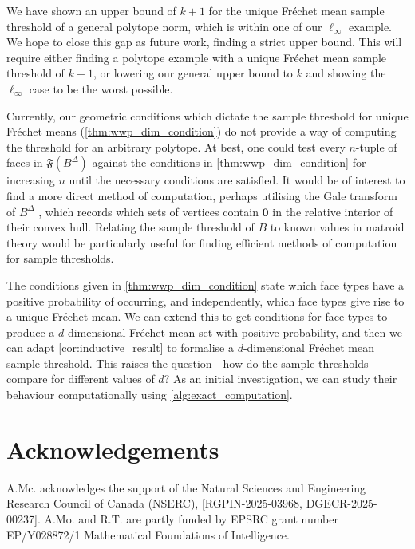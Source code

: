 \documentclass[10pt]{article}
\theoremstyle{definition}
\theoremstyle{remark}
\renewcommand{\vec}[1]{\mathbf{#1}}
\begin{document}
	We have shown an upper bound of $k+1$ for the unique Fr\'echet mean sample threshold of a general polytope norm, which is within one of our $\ell_{\infty}$ example. We hope to close this gap as future work, finding a strict upper bound. This will require either finding a polytope example with a unique Fr\'echet mean sample threshold of $k+1$, or lowering our general upper bound to $k$ and showing the $\ell_\infty$ case to be the worst possible.
	
	Currently, our geometric conditions which dictate the sample threshold for unique Fr\'echet means (\cref{thm:wwp_dim_condition}) do not provide a way of computing the threshold for an arbitrary polytope. At best, one could test every $n$-tuple of faces in $\mathfrak F (B^{\Delta})$ against the conditions in \cref{thm:wwp_dim_condition} for increasing $n$ until the necessary conditions are satisfied. It would be of interest to find a more direct method of computation, perhaps utilising the Gale transform of $B^{\Delta}$ \cite[Chapter 6]{ziegler2012lectures}, which records which sets of vertices contain $\vec 0$ in the relative interior of their convex hull. Relating the sample threshold of $B$ to known values in matroid theory would be particularly useful for finding efficient methods of computation for sample thresholds.
	
	The conditions given in \cref{thm:wwp_dim_condition} state which face types have a positive probability of occurring, and independently, which face types give rise to a unique Fr\'echet mean. We can extend this to get conditions for face types to produce a $d$-dimensional Fr\'echet mean set with positive probability, and then we can adapt \cref{cor:inductive_result} to formalise a $d$-dimensional Fr\'echet mean sample threshold. This raises the question - how do the sample thresholds compare for different values of $d$? As an initial investigation, we can study their behaviour computationally using \cref{alg:exact_computation}.
	
	\section{Acknowledgements}
	A.Mc. acknowledges the support of the Natural Sciences and Engineering Research Council of Canada (NSERC), [RGPIN-2025-03968, DGECR-2025-00237]. A.Mo. and R.T. are partly funded by EPSRC grant number EP/Y028872/1 Mathematical Foundations of Intelligence.
	
	\newpage
	
	
	
\end{document}

